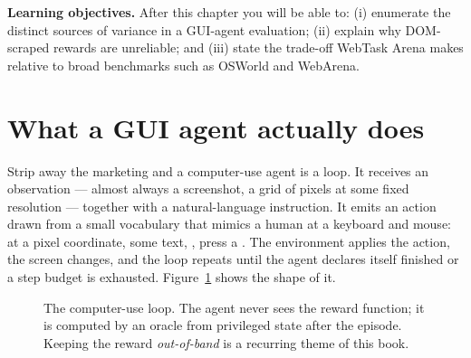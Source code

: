 \documentclass[11pt,openany]{book}
\newcommand{\code}[1]{\textcolor{clayd}{\texttt{\detokenize{#1}}}}
\begin{document}
\textbf{Learning objectives.} After this chapter you will be able to: (i)
enumerate the distinct sources of variance in a GUI-agent evaluation; (ii)
explain why DOM-scraped rewards are unreliable; and (iii) state the trade-off
WebTask Arena makes relative to broad benchmarks such as OSWorld and WebArena.

\section{What a GUI agent actually does}

Strip away the marketing and a computer-use agent is a loop. It receives an
observation — almost always a screenshot, a grid of pixels at some fixed
resolution — together with a natural-language instruction. It emits an action
drawn from a small vocabulary that mimics a human at a keyboard and mouse:
\code{left_click} at a pixel coordinate, \code{type} some text, \code{scroll},
press a \code{key}. The environment applies the action, the screen changes, and
the loop repeats until the agent declares itself finished or a step budget is
exhausted. Figure~\ref{fig:loop} shows the shape of it.

\begin{figure}[t]
\centering
{}
\caption{The computer-use loop. The agent never sees the reward function; it is
computed by an oracle from privileged state after the episode. Keeping the reward
\emph{out-of-band} is a recurring theme of this book.}
\label{fig:loop}
\end{figure}
\end{document}
